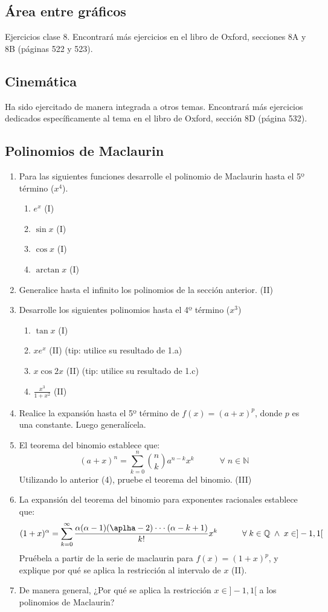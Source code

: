 \documentclass[spanish,12pt]{article}
\begin{document}
\subsection{Área entre gráficos}
Ejercicios clase 8.
Encontrará más ejercicios en el libro de Oxford, secciones 8A y 8B (páginas 522 y 523).
\subsection{Cinemática}
Ha sido ejercitado de manera integrada a otros temas.
Encontrará más ejercicios dedicados específicamente al tema en el libro de Oxford, sección 8D (página 532).
\subsection{Polinomios de Maclaurin}
\begin{enumerate}[1)]
    \item Para las siguientes funciones desarrolle el polinomio de Maclaurin hasta el 5º término ($x^4$).
    \begin{enumerate}
        \item $e^x$ (I)
        \item $\sin{x}$ (I)
        \item $\cos{x}$ (I)
        \item $\arctan x$ (I)
    \end{enumerate}
    \item Generalice hasta el infinito los polinomios de la sección anterior. (II)
    \item Desarrolle los siguientes polinomios hasta el 4º término ($x^3$)
    \begin{enumerate}
        \item $\tan x$ (I)
        \item $xe^{x}$ (II) (tip: utilice su resultado de 1.a)
        \item $x\cos{2x}$ (II) (tip: utilice su resultado de 1.c)
        \item $\frac{x^3}{1+x^2}$ (II)
    \end{enumerate}
    \item Realice la expansión hasta el 5º término de $f(x)=(a+x)^p$, donde $p$ es una constante. Luego generalícela.
    \item El teorema del binomio establece que:
    $$(a+x)^n=\sum_{k=0}^{n}{n\choose k}a^{n-k}x^{k}\quad\quad\quad\forall\; n\in\mathbb{N}$$
    Utilizando lo anterior (4), pruebe el teorema del binomio. (III)
    \item La expansión del teorema del binomio para exponentes racionales establece que:
    $$(1+x)^\alpha=\sum_{k=0}^{\infty}\frac{\alpha(\alpha-1)(\aplha-2)\cdot\cdot\cdot(\alpha-k+1)}{k!}x^{k}\quad\quad\quad\forall\; k\in\mathbb{Q}\;\wedge\;x\in]-1,1[$$
    Pruébela a partir de la serie de maclaurin para $f(x)=(1+x)^p$, y explique por qué se aplica la restricción al intervalo de $x$ (II).
    \item De manera general, ¿Por qué se aplica la restricción $x\in]-1,1[$ a los polinomios de Maclaurin?
\end{enumerate}
\end{document}
